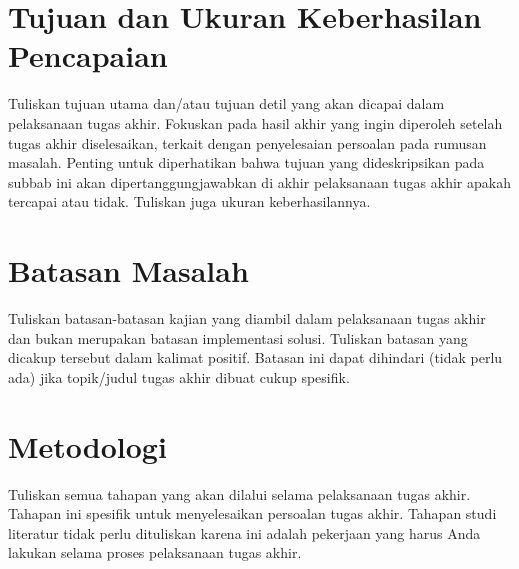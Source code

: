 \section{Tujuan dan Ukuran Keberhasilan Pencapaian}
\begin{petunjuk}
Tuliskan tujuan utama dan/atau tujuan detil yang akan dicapai dalam pelaksanaan tugas akhir. Fokuskan pada hasil akhir yang ingin diperoleh setelah tugas akhir diselesaikan, terkait dengan penyelesaian persoalan pada rumusan masalah. Penting untuk diperhatikan bahwa tujuan yang dideskripsikan pada subbab ini akan dipertanggungjawabkan di akhir pelaksanaan tugas akhir apakah tercapai atau tidak. Tuliskan juga ukuran keberhasilannya.
\end{petunjuk}

\section{Batasan Masalah}
\begin{petunjuk}
Tuliskan batasan-batasan kajian yang diambil dalam pelaksanaan tugas akhir dan bukan merupakan batasan implementasi solusi. Tuliskan batasan yang dicakup tersebut dalam kalimat positif. Batasan ini dapat dihindari (tidak perlu ada) jika topik/judul tugas akhir dibuat cukup spesifik.
\end{petunjuk}

\section{Metodologi}
\begin{petunjuk}
Tuliskan semua tahapan yang akan dilalui selama pelaksanaan tugas akhir. Tahapan ini spesifik untuk menyelesaikan persoalan tugas akhir. Tahapan studi literatur tidak perlu dituliskan karena ini adalah pekerjaan yang harus Anda lakukan selama proses pelaksanaan tugas akhir.
\end{petunjuk}
